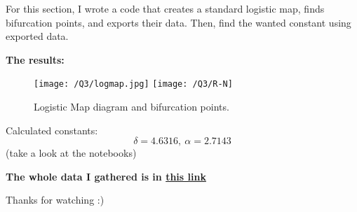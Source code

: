 \documentclass{article}
\begin{document}
    For this section, I wrote a code that creates a standard logistic map,
    finds bifurcation points, and exports their data.
    Then, find the wanted constant using exported data.

    \textbf{The results:}

    \begin{figure}[!htb]
        \centering
        \texttt{[image: /Q3/logmap.jpg]}
        \label{fig:3.1}
        \texttt{[image: /Q3/R-N]}
        \label{fig:3.2}
        \caption{Logistic Map diagram and bifurcation points.}
    \end{figure}

    Calculated constants:
    $$\delta = 4.6316,\ \alpha = 2.7143$$(take a look at the notebooks)

    \pagebreak

    \centering
    \textbf{The whole data I gathered is in \href{https://github.com/shahmari/ComputationalPhysics-Fall2021/tree/main/ProblemSet7/Data}{this link}}

    Thanks for watching :)
\end{document}
